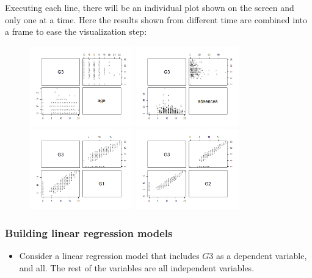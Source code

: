 \documentclass[a4paper]{article}
\numberwithin{equation}{section}
\begin{document}
Executing each line, there will be an individual plot shown on the screen and only one at a time. Here the results shown from different time are combined into a frame to ease the visualization step:

\begin{figure}[H]
  \centering
  \includegraphics[width=0.4\textwidth]{pairs_age.png}
  \includegraphics[width=0.4\textwidth]{pairs_ab.png}
  \includegraphics[width=0.4\textwidth]{pairs_g1.png}
  \includegraphics[width=0.4\textwidth]{pairs_g2.png}
\end{figure}


\subsubsection{Building linear regression models}
\begin{itemize}
  \item Consider a linear regression model that includes \(G3\) as a dependent variable, and all. The rest of the variables are all independent variables.
\end{itemize}
\end{document}
